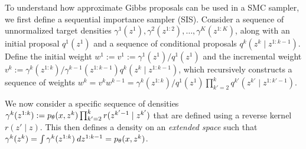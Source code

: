 \documentclass[anonymous=false, %
               format=acmsmall, %
               review=true, %
               screen=true, %
               nonacm=true]{acmart}
\theoremstyle{definition}
\begin{document}
To understand how approximate Gibbs proposals can be used in a SMC sampler, we first define a sequential importance sampler (SIS). Consider a sequence of unnormalized target densities $\gamma^1(z^1), \gamma^2(z^{1:2}), \dots, \gamma^K(z^{1:K})$, along with an initial proposal $q^1(z^1)$ and a sequence of conditional proposals $q^k(z^k \mid z^{1:k-1})$. Define the initial weight $w^1 := v^1 := \gamma^1(z^1) / q^1(z^1)$ and the incremental weight $v^k:=  \gamma^k(z^{1:k}) / \gamma^{k-1}(z^{1:k-1}) q^k(z^k \mid z^{1:k-1})$, which recursively constructs a sequence of weights $w^k = v^k w^{k-1}= \gamma^k(z^{1:k}) / q^1(z^1) \prod_{k'=2}^k q^{k'}(z^{k'} \mid z^{1:k'-1})$.


We now consider a specific sequence of densities $\gamma^k(z^{1:k}):= p_\theta(x,z^k) \prod_{k'=2}^{k} r(z^{k'-1} \mid z^{k'})$ that are defined using a reverse kernel $r(z' \mid z)$. This then defines a density on an \emph{extended space} such that $\gamma^k(z^k) = \int \gamma^k(z^{1:k}) \: dz^{1:k-1} = p_\theta(x, z^k)$.
\end{document}
